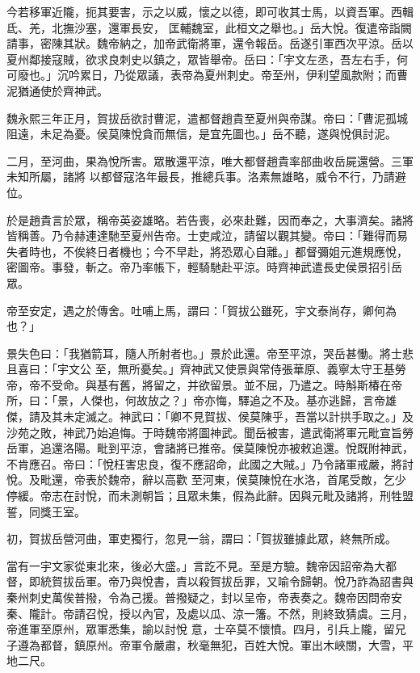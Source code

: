 \begin{pinyinscope}
 今若移軍近隴，扼其要害，示之以威，懷之以德，即可收其士馬，以資吾軍。西輯氐、羌，北撫沙塞，還軍長安，
 匡輔魏室，此桓文之舉也。」岳大悅。復遣帝詣闕請事，密陳其狀。魏帝納之，加帝武衛將軍，還令報岳。岳遂引軍西次平涼。岳以夏州鄰接寇賊，欲求良刺史以鎮之，眾皆舉帝。岳曰：「宇文左丞，吾左右手，何可廢也。」沉吟累日，乃從眾議，表帝為夏州刺史。帝至州，伊利望風款附；而曹泥猶通使於齊神武。



 魏永熙三年正月，賀拔岳欲討曹泥，遣都督趙貴至夏州與帝謀。帝曰：「曹泥孤城阻遠，未足為憂。侯莫陳悅貪而無信，是宜先圖也。」岳不聽，遂與悅俱討泥。



 二月，至河曲，果為悅所害。眾散還平涼，唯大都督趙貴率部曲收岳屍還營。三軍未知所屬，諸將
 以都督寇洛年最長，推總兵事。洛素無雄略，威令不行，乃請避位。



 於是趙貴言於眾，稱帝英姿雄略。若告喪，必來赴難，因而奉之，大事濟矣。諸將皆稱善。乃令赫連達馳至夏州告帝。士吏咸泣，請留以觀其變。帝曰：「難得而易失者時也，不俟終日者機也；今不早赴，將恐眾心自離。」都督彌姐元進規應悅，密圖帝。事發，斬之。帝乃率帳下，輕騎馳赴平涼。時齊神武遣長史侯景招引岳眾。



 帝至安定，遇之於傳舍。吐哺上馬，謂曰：「賀拔公雖死，宇文泰尚存，卿何為也？」



 景失色曰：「我猶箭耳，隨人所射者也。」景於此還。帝至平涼，哭岳甚慟。將士悲且喜曰：「宇文公
 至，無所憂矣。」齊神武又使景與常侍張華原、義寧太守王基勞帝，帝不受命。與基有舊，將留之，并欲留景。並不屈，乃遣之。時斛斯椿在帝所，曰：「景，人傑也，何故放之？」帝亦悔，驛追之不及。基亦逃歸，言帝雄傑，請及其未定滅之。神武曰：「卿不見賀拔、侯莫陳乎，吾當以計拱手取之。」及沙苑之敗，神武乃始追悔。于時魏帝將圖神武。聞岳被害，遣武衛將軍元毗宣旨勞岳軍，追還洛陽。毗到平涼，會諸將已推帝。侯莫陳悅亦被敕追還。悅既附神武，不肯應召。帝曰：「悅枉害忠良，復不應詔命，此國之大賊。」乃令諸軍戒嚴，將討悅。及毗還，帝表於魏帝，辭以高歡
 至河東，侯莫陳悅在水洛，首尾受敵，乞少停緩。帝志在討悅，而未測朝旨；且眾未集，假為此辭。因與元毗及諸將，刑牲盟誓，同獎王室。



 初，賀拔岳營河曲，軍吏獨行，忽見一翁，謂曰：「賀拔雖據此眾，終無所成。



 當有一宇文家從東北來，後必大盛。」言訖不見。至是方驗。魏帝因詔帝為大都督，即統賀拔岳軍。帝乃與悅書，責以殺賀拔岳罪，又喻令歸朝。悅乃詐為詔書與秦州刺史萬俟普撥，令為己援。普撥疑之，封以呈帝，帝表奏之。魏帝因問帝安秦、隴計。帝請召悅，授以內官，及處以瓜、涼一籓。不然，則終致猜虞。三月，帝進軍至原州，眾軍悉集，諭以討悅
 意，士卒莫不懷憤。四月，引兵上隴，留兄子遵為都督，鎮原州。帝軍令嚴肅，秋毫無犯，百姓大悅。軍出木峽關，大雪，平地二尺。




\end{pinyinscope}
